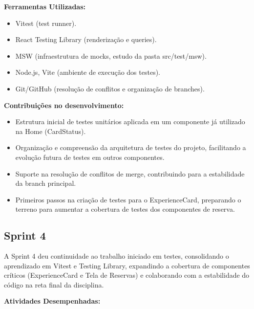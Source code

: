 \textbf{Ferramentas Utilizadas:}

\begin{itemize}
\item
  Vitest (test runner).
\item
  React Testing Library (renderização e queries).
\item
  MSW (infraestrutura de mocks, estudo da pasta src/test/msw).
\item
  Node.js, Vite (ambiente de execução dos testes).
\item
  Git/GitHub (resolução de conflitos e organização de branches).
\end{itemize}

\textbf{Contribuições no desenvolvimento:}

\begin{itemize}
\item
  Estrutura inicial de testes unitários aplicada em um componente já
  utilizado na Home (CardStatus).
\item
  Organização e compreensão da arquitetura de testes do projeto,
  facilitando a evolução futura de testes em outros componentes.
\item
  Suporte na resolução de conflitos de merge, contribuindo para a
  estabilidade da branch principal.
\item
  Primeiros passos na criação de testes para o ExperienceCard,
  preparando o terreno para aumentar a cobertura de testes dos
  componentes de reserva.
\end{itemize}

\subsection{Sprint 4}

A Sprint 4 deu continuidade ao trabalho iniciado em testes, consolidando
o aprendizado em Vitest e Testing Library, expandindo a cobertura de
componentes críticos (ExperienceCard e Tela de Reservas) e colaborando
com a estabilidade do código na reta final da disciplina.

\textbf{Atividades Desempenhadas:}

